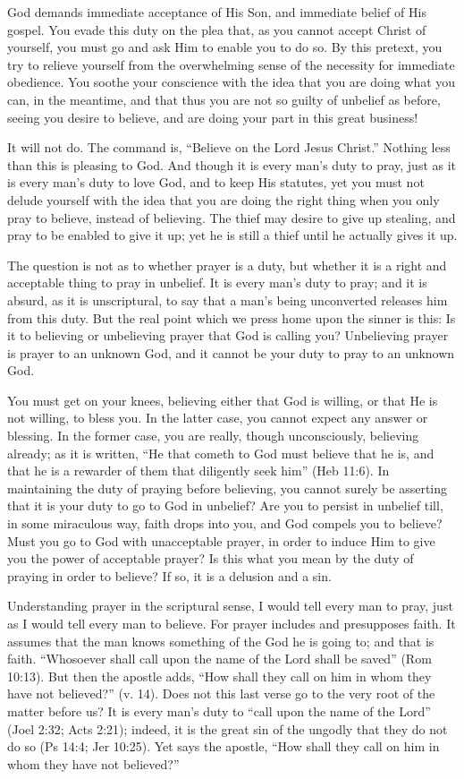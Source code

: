 \documentclass[
]{book}
\begin{document}
God demands immediate acceptance of His Son, and immediate belief of His gospel. You evade this duty on the plea that, as you cannot accept Christ of yourself, you must go and ask Him to enable you to do so. By this pretext, you try to relieve yourself from the overwhelming sense of the necessity for immediate obedience. You soothe your conscience with the idea that you are doing what you can, in the meantime, and that thus you are not so guilty of unbelief as before, seeing you desire to believe, and are doing your part in this great business!

It will not do. The command is, ``Believe on the Lord Jesus Christ.'' Nothing less than this is pleasing to God. And though it is every man's duty to pray, just as it is every man's duty to love God, and to keep His statutes, yet you must not delude yourself with the idea that you are doing the right thing when you only pray to believe, instead of believing. The thief may desire to give up stealing, and pray to be enabled to give it up; yet he is still a thief until he actually gives it up.

The question is not as to whether prayer is a duty, but whether it is a right and acceptable thing to pray in unbelief. It is every man's duty to pray; and it is absurd, as it is unscriptural, to say that a man's being unconverted releases him from this duty. But the real point which we press home upon the sinner is this: Is it to believing or unbelieving prayer that God is calling you? Unbelieving prayer is prayer to an unknown God, and it cannot be your duty to pray to an unknown God.

You must get on your knees, believing either that God is willing, or that He is not willing, to bless you. In the latter case, you cannot expect any answer or blessing. In the former case, you are really, though unconsciously, believing already; as it is written, ``He that cometh to God must believe that he is, and that he is a rewarder of them that diligently seek him'' (Heb 11:6). In maintaining the duty of praying before believing, you cannot surely be asserting that it is your duty to go to God in unbelief? Are you to persist in unbelief till, in some miraculous way, faith drops into you, and God compels you to believe? Must you go to God with unacceptable prayer, in order to induce Him to give you the power of acceptable prayer? Is this what you mean by the duty of praying in order to believe? If so, it is a delusion and a sin.

Understanding prayer in the scriptural sense, I would tell every man to pray, just as I would tell every man to believe. For prayer includes and presupposes faith. It assumes that the man knows something of the God he is going to; and that is faith. ``Whosoever shall call upon the name of the Lord shall be saved'' (Rom 10:13). But then the apostle adds, ``How shall they call on him in whom they have not believed?'' (v. 14). Does not this last verse go to the very root of the matter before us? It is every man's duty to ``call upon the name of the Lord'' (Joel 2:32; Acts 2:21); indeed, it is the great sin of the ungodly that they do not do so (Ps 14:4; Jer 10:25). Yet says the apostle, ``How shall they call on him in whom they have not believed?''
\end{document}
